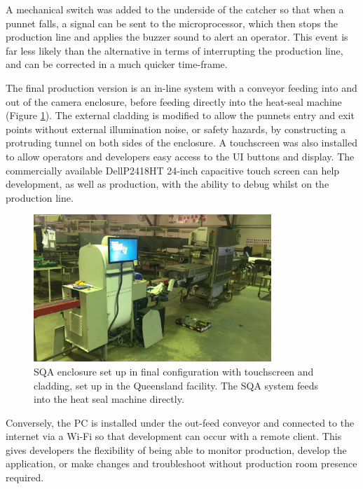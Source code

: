 \documentclass[fleqn,twoside,12pt]{report}
\begin{document}
A mechanical switch was added to the underside of the catcher so that when a punnet falls, a signal can be sent to the microprocessor, which then stops the production line and applies the buzzer sound to alert an operator. This event is far less likely than the alternative in terms of interrupting the production line, and can be corrected in a much quicker time-frame.

The final production version is an in-line system with a conveyor feeding into and out of the camera enclosure, before feeding directly into the heat-seal machine (Figure \ref{fig:production_final}). The external cladding is modified to allow the punnets entry and exit points without external illumination noise, or safety hazards, by constructing a protruding tunnel on both sides of the enclosure. A touchscreen was also installed to allow operators and developers easy access to the UI buttons and display. The commercially available Dell\textregistered P2418HT 24-inch capacitive touch screen can help development, as well as production, with the ability to debug whilst on the production line.


\begin{figure}[ht]
	\centering
	\includegraphics[width=0.8\textwidth]{images/production_final.JPG}
	\caption{SQA enclosure set up in final configuration with touchscreen and cladding, set up in the Queensland facility. The SQA system feeds into the heat seal machine directly.}
	\label{fig:production_final}
\end{figure}

Conversely, the PC is installed under the out-feed conveyor and connected to the internet via a Wi-Fi so that development can occur with a remote client. This gives developers the flexibility of being able to monitor production, develop the application, or make changes and troubleshoot without production room presence required.
\end{document}
